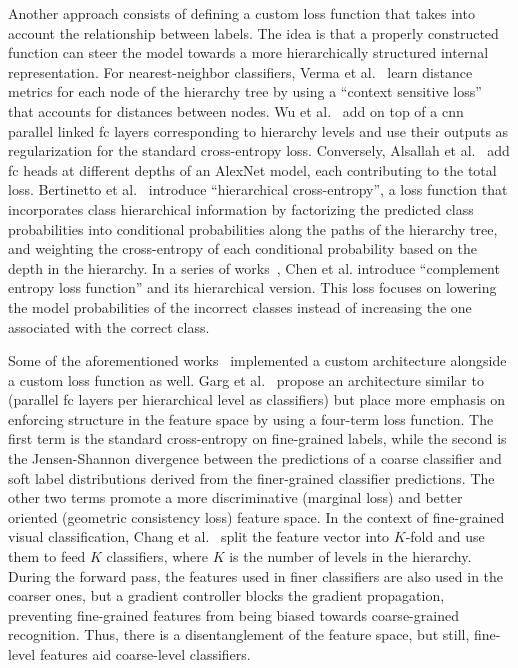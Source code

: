 Another approach consists of defining a custom loss function that takes into account the relationship between labels. The idea is that a properly constructed function can steer the model towards a more hierarchically structured internal representation.
For nearest-neighbor classifiers, Verma et al.~\cite{LearningHierarVerma2012} learn distance metrics for each node of the hierarchy tree by using a ``context sensitive loss'' that accounts for distances between nodes.
Wu et al.~\cite{LearningToMakWuHu2016} add on top of a \acrshort{cnn} parallel linked \acrshort{fc} layers corresponding to hierarchy levels and use their outputs as regularization for the standard cross-entropy loss.
Conversely, Alsallah et al.~\cite{DoConvolutionaAlsall2017} add \acrshort{fc} heads at different depths of an AlexNet model, each contributing to the total loss.
Bertinetto et al.~\cite{MakingBetterMBertin2019} introduce ``hierarchical cross-entropy'', a loss function that incorporates class hierarchical information by factorizing the predicted class probabilities into conditional probabilities along the paths of the hierarchy tree, and weighting the cross-entropy of each conditional probability based on the depth in the hierarchy.
In a series of works~\cite{ComplementObjeChen2019, ImprovingAdverChen2019, LearningWithHChen2019}, Chen et al. introduce ``complement entropy loss function'' and its hierarchical version. This loss focuses on lowering the model probabilities of the incorrect classes instead of increasing the one associated with the correct class.

Some of the aforementioned works~\cite{LearningToMakWuHu2016, DoConvolutionaAlsall2017} implemented a custom architecture alongside a custom loss function as well.
Garg et al.~\cite{LearningHierarGarg2022} propose an architecture similar to~\cite{LearningToMakWuHu2016} (parallel \acrshort{fc} layers per hierarchical level as classifiers) but place more emphasis on enforcing structure in the feature space by using a four-term loss function. The first term is the standard cross-entropy on fine-grained labels, while the second is the Jensen-Shannon divergence between the predictions of a coarse classifier and soft label distributions derived from the finer-grained classifier predictions. The other two terms promote a more discriminative (marginal loss) and better oriented (geometric consistency loss) feature space.
In the context of fine-grained visual classification, Chang et al.~\cite{YourFlamingoChang2020} split the feature vector into $K$-fold and use them to feed $K$ classifiers, where $K$ is the number of levels in the hierarchy. During the forward pass, the features used in finer classifiers are also used in the coarser ones, but a gradient controller blocks the gradient propagation, preventing fine-grained features from being biased towards coarse-grained recognition. Thus, there is a disentanglement of the feature space, but still, fine-level features aid coarse-level classifiers.

